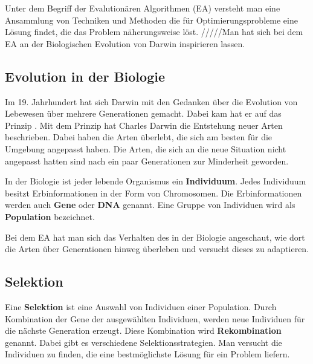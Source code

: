 
Unter dem Begriff der Evalution{\"a}ren Algorithmen (EA) versteht man eine Ansammlung von Techniken und Methoden die f{\"u}r Optimierungsprobleme eine L{\"o}sung findet, die das Problem n{\"a}herungsweise löst. \cite{weicker2015evolutionare} 
/////Man hat sich bei dem EA an der Biologischen Evolution von Darwin inspirieren lassen. \cite{selzam2003genetische}


\subsection{Evolution in der Biologie}
Im 19. Jahrhundert hat sich Darwin mit den Gedanken {\"u}ber die Evolution von Lebewesen {\"u}ber mehrere Generationen gemacht. Dabei kam hat er auf das Prinzip . Mit dem Prinzip hat Charles Darwin die Entstehung neuer Arten beschrieben. Dabei haben die Arten {\"u}berlebt, die sich am besten f{\"u}r die Umgebung angepasst haben. Die Arten, die sich an die neue Situation nicht angepasst hatten sind nach ein paar Generationen zur Minderheit geworden. \cite{hunermann2007brockhaus}

In der Biologie ist jeder lebende Organismus ein \textbf{Individuum}.
Jedes Individuum besitzt Erbinformationen in der Form von Chromosomen. Die Erbinformationen werden auch \textbf{Gene} oder \textbf{DNA} genannt. 
Eine Gruppe von Individuen wird als \textbf{Population} bezeichnet. 

Bei dem EA hat man sich das Verhalten des in der Biologie angeschaut, wie dort die Arten über Generationen hinweg überleben und versucht dieses zu adaptieren. \cite{flickevolutionare}

\subsection{Selektion}

Eine \textbf{Selektion} ist eine Auswahl von Individuen einer Population. Durch Kombination der Gene der ausgew{\"a}hlten Individuen, werden neue Individuen f{\"u}r die n{\"a}chste Generation erzeugt. Diese Kombination wird \textbf{Rekombination} genannt.
Dabei gibt es verschiedene Selektionsstrategien. Man versucht die Individuen zu finden, die eine bestm{\"o}glichste L{\"o}sung f{\"u}r ein Problem liefern. \cite{weicker2015evolutionare, flickevolutionare}


